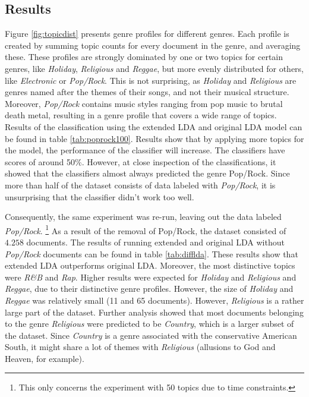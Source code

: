 \subsection{Results}
Figure \ref{fig:topicdist} presents genre profiles for different genres. Each profile is created by summing topic counts for every document in the genre, and averaging these. These profiles are strongly dominated by one or two topics for certain genres, like \textit{Holiday}, \textit{Religious} and \textit{Reggae}, but more evenly distributed for others, like \textit{Electronic} or \textit{Pop/Rock}. This is not surprising, as \textit{Holiday} and \textit{Religious} are genres named after the themes of their songs, and not their musical structure. Moreover, \textit{Pop/Rock} contains music styles ranging from pop music to brutal death metal, resulting in a genre profile that covers a wide range of topics. Results of the classification using the extended LDA and original LDA model can be found in table \ref{tab:poprock100}. Results show that by applying more topics for the model, the performance of the classifier will increase. The classifiers have scores of around 50\%. However, at close inspection of the classifications, it showed that the classifiers almost always predicted the genre Pop/Rock. Since more than half of the dataset consists of data labeled with \textit{Pop/Rock}, it is unsurprising that the classifier didn't work too well. 


Consequently, the same experiment was re-run, leaving out the data labeled \textit{Pop/Rock}. \footnote{This only concerns the experiment with 50 topics due to time constraints.} As a result of the removal of Pop/Rock, the dataset consisted of $4.258$ documents. The results of running extended and original LDA without \textit{Pop/Rock} documents can be found in table \ref{tab:difflda}. These results show that extended LDA outperforms original LDA. Moreover, the most distinctive topics were \textit{R\&B} and \textit{Rap}. Higher results were expected for \textit{Holiday} and \textit{Religious} and \textit{Reggae}, due to their distinctive genre profiles. However, the size of \textit{Holiday} and \textit{Reggae} was relatively small (11 and 65 documents). However, \textit{Religious} is a rather large part of the dataset. Further analysis showed that most documents belonging to the genre \textit{Religious} were predicted to be \textit{Country}, which is a larger subset of the dataset. Since \textit{Country} is a genre associated with the conservative American South, it might share a lot of themes with \textit{Religious} (allusions to God and Heaven, for example). 


